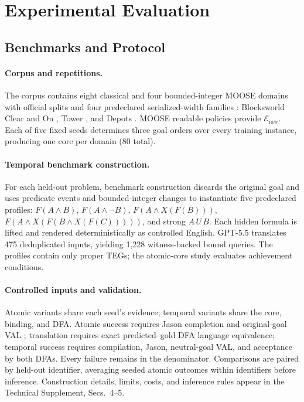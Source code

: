 \section{Experimental Evaluation}
\label{sec:evaluation}

\subsection{Benchmarks and Protocol}

\paragraph{Corpus and repetitions.}
The corpus contains eight classical and four bounded-integer MOOSE domains with
official splits \cite{Chen2026Moose,DillonZChenMooseDataset} and four
predeclared serialized-width families \cite{LipovetzkyGeffner2012Width}:
Blocksworld Clear and On
\cite{Frances2021LearningGeneralPolicies,BonetLearnerPoliciesRepository},
Tower \cite{Bacchus2001AIPS00,PotasscoPDDLInstances}, and Depots
\cite{Bonet2018Features,RLeapD2LRepository}. MOOSE readable policies provide
$\mathcal E_{\mathrm{raw}}$. Each of five fixed seeds determines
three goal orders over every training instance, producing one core per domain (80
total).

\paragraph{Temporal benchmark construction.}
For each held-out problem, benchmark construction discards the original goal and uses
predicate events and bounded-integer changes to instantiate five predeclared
profiles: $F(A\land B)$, $F(A\land\neg B)$,
$F(A\land X(F(B)))$,
$F(A\land X(F(B\land X(F(C)))))$, and strong $A\,U\,B$.
Each hidden formula is lifted and rendered deterministically as
controlled English. GPT-5.5 \cite{OpenAI2026GPT55SystemCard} translates 475
deduplicated inputs, yielding 1,228 witness-backed bound queries.
The profiles contain only proper TEGs; the atomic-core study evaluates
achievement conditions.

\paragraph{Controlled inputs and validation.}
Atomic variants share each seed's evidence; temporal variants share the core,
binding, and DFA. Atomic success requires Jason completion and original-goal
VAL \cite{Bordini2007Jason,Howey2004VAL}; translation requires exact predicted--gold
DFA language equivalence; temporal success requires compilation, Jason,
neutral-goal VAL, and acceptance by both DFAs. Every failure remains in the
denominator. Comparisons are paired by held-out identifier, averaging seeded
atomic outcomes within identifiers before inference. Construction details,
limits, costs, and inference rules appear in the Technical Supplement,
Secs.~4--5.

